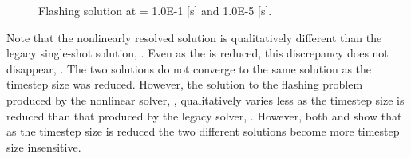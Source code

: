 \begin{figure}[h!t]
\centering
{}
\caption[Flashing solution at \dtmax{} = 1.0E-1 {[s]}and 1.0E-5 {[s]}]{Flashing solution at \dtmax{} = 1.0E-1 {[s]} and 1.0E-5 {[s]}.}
\label{fig:flashing_compare_1}
\end{figure}

Note that the nonlinearly resolved solution is qualitatively different than the legacy single-shot solution, .
Even as the \dtmax{} is reduced, this discrepancy does not disappear, .
The two solutions do not converge to the same solution as the timestep size was reduced.
However, the solution to the flashing problem produced by the nonlinear solver, , qualitatively varies less as the timestep size is reduced than that produced by the legacy solver, .
However, both  and  show that as the timestep size is reduced the two different solutions become more timestep size insensitive.


